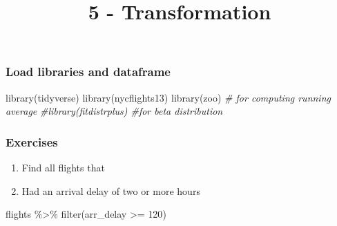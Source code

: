 \documentclass[
]{article}
\title{5 - Transformation}
\author{}
\date{\vspace{-2.5em}}
\newenvironment{Shaded}{\begin{snugshade}}{\end{snugshade}}
\newcommand{\CommentTok}[1]{\textcolor[rgb]{0.56,0.35,0.01}{\textit{#1}}}
\newcommand{\DecValTok}[1]{\textcolor[rgb]{0.00,0.00,0.81}{#1}}
\newcommand{\FunctionTok}[1]{\textcolor[rgb]{0.00,0.00,0.00}{#1}}
\newcommand{\NormalTok}[1]{#1}
\newcommand{\SpecialCharTok}[1]{\textcolor[rgb]{0.00,0.00,0.00}{#1}}
\begin{document}
\maketitle

\hypertarget{load-libraries-and-dataframe}{%
\subsubsection{Load libraries and
dataframe}\label{load-libraries-and-dataframe}}

\begin{Shaded}
\begin{Highlighting}[]
\FunctionTok{library}\NormalTok{(tidyverse)}
\FunctionTok{library}\NormalTok{(nycflights13)}
\FunctionTok{library}\NormalTok{(zoo) }\CommentTok{\# for computing running average}
\CommentTok{\#library(fitdistrplus) \#for beta distribution}
\end{Highlighting}
\end{Shaded}

\hypertarget{exercises}{%
\subsubsection{Exercises}\label{exercises}}

\begin{enumerate}
\def\labelenumi{\arabic{enumi}.}
\item
  Find all flights that
\item
  Had an arrival delay of two or more hours
\end{enumerate}

\begin{Shaded}
\begin{Highlighting}[]
\NormalTok{flights }\SpecialCharTok{\%\textgreater{}\%} \FunctionTok{filter}\NormalTok{(arr\_delay }\SpecialCharTok{\textgreater{}=} \DecValTok{120}\NormalTok{)}
\end{Highlighting}
\end{Shaded}
\end{document}
